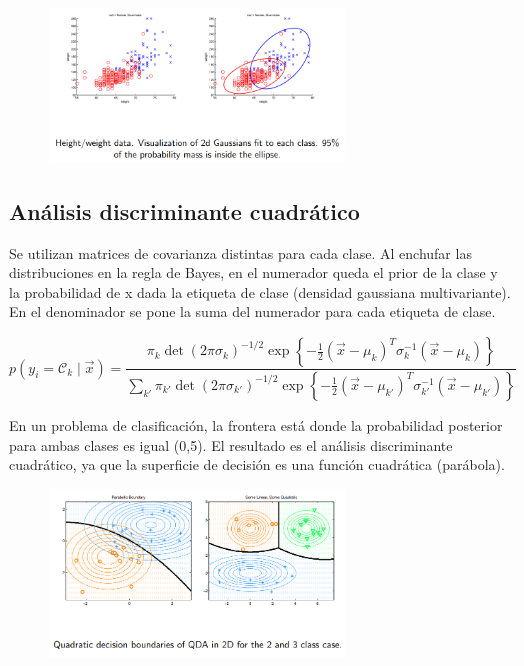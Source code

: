 \begin{figure}[h]
\centering
\includegraphics[width = 0.7\textwidth]{figs/multivariant-gaussian.png}
\end{figure}

\subsection{Análisis discriminante cuadrático}
Se utilizan matrices de covarianza distintas para cada clase. Al enchufar las distribuciones en la regla de Bayes, en el numerador queda el prior de la clase y la probabilidad de x dada la etiqueta de clase (densidad gaussiana multivariante). En el denominador se pone la suma del numerador para cada etiqueta de clase. 

$$
p(y_i = \mathcal{C}_k \mid \vec{x}) =
\frac{\pi_k \det(2 \pi \sigma_k)^{-1/2} \exp \left\{ -\frac{1}{2} (\vec{x} - \mu_k)^T \sigma_k^{-1} (\vec{x} - \mu_k) \right\}}
{\sum_{k'} \pi_{k'} \det(2 \pi \sigma_{k'})^{-1/2} \exp \left\{ -\frac{1}{2} (\vec{x} - \mu_{k'})^T \sigma_{k'}^{-1} (\vec{x} - \mu_{k'}) \right\} }
$$

En un problema de clasificación, la frontera está donde la probabilidad posterior para ambas clases es igual (0,5). El resultado es el análisis discriminante cuadrático, ya que la superficie de decisión es una función cuadrática (parábola).

\begin{figure}[h]
\centering
\includegraphics[width = 0.7\textwidth]{figs/qda.png}
\end{figure}

